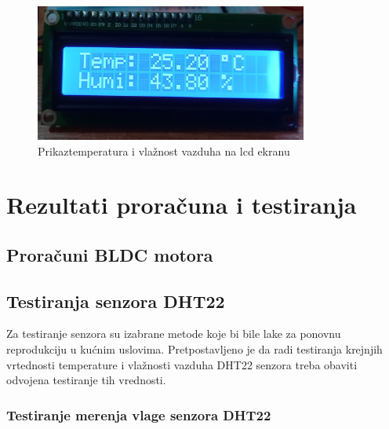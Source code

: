 \documentclass[a4paper, 12pt]{article}
\begin{document}
\vspace{10pt}

\begin{figure}[H]
\centering
\includegraphics[width=0.8\textwidth]{images/lcd_prikaz_temp_humi}
\caption{Prikaztemperatura i vlažnost vazduha na  lcd ekranu}\label{fig:lcd_prikaz_temp_humi}
\end{figure}

\endgroup
\pagebreak

\begingroup
\justifying
\section{Rezultati proračuna i testiranja}

\vspace{10pt}


	\subsection{Proračuni BLDC motora }
	

\vspace{10pt}



\pagebreak

	\subsection{Testiranja senzora DHT22}
	
\vspace{10pt}

Za testiranje senzora su izabrane metode koje bi bile lake za ponovnu reprodukciju u kućnim uslovima. Pretpostavljeno je da radi testiranja krejnjih vrtednosti temperature i vlažnosti vazduha DHT22 senzora treba obaviti odvojena testiranje tih vrednosti. 

		\subsubsection*{Testiranje merenja vlage senzora DHT22}
\end{document}
